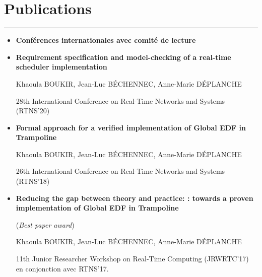 \newpage
\section{Publications} \label{sec:publi}
\vspace{-0.6cm}
\hspace{0.7cm}\textcolor{myblue}{\rule{15cm}{1mm}}


\begin{itemize}
	\item \textbf{{\Large Conférences internationales avec comité de lecture }}	
\end{itemize}

\begin{minipage}{0.08\textwidth}
	\hspace{0.1cm}
\end{minipage}
\begin{minipage}{0.9\textwidth}
	
	\begin{itemize}[label=\cite{boukir2020requirement}]
		\item	\textbf{Requirement specification and model-checking of a real-time scheduler implementation}
		
		Khaoula BOUKIR, Jean-Luc B\'{E}CHENNEC, Anne-Marie D\'{E}PLANCHE
		
		28th International Conference on Real-Time Networks and Systems (RTNS'20)
		
		
		
	\end{itemize}
	
	\begin{itemize}[label=	\cite{boukir2018formal} ]
		\item	\textbf{Formal approach for a verified implementation of Global EDF in Trampoline}
		
		Khaoula BOUKIR, Jean-Luc B\'{E}CHENNEC, Anne-Marie D\'{E}PLANCHE
		
		26th International Conference on Real-Time Networks and Systems (RTNS'18)
	\end{itemize}
	
	\begin{itemize}[label=	\cite{boukir2017reducing}]
		\item	\textbf{Reducing the gap between theory and practice: : towards a proven implementation of Global EDF in Trampoline}
		
		(\textit{Best paper award})
		
		Khaoula BOUKIR, Jean-Luc B\'{E}CHENNEC, Anne-Marie D\'{E}PLANCHE
		
		11th Junior Researcher Workshop on Real-Time Computing (JRWRTC'17) en conjonction avec RTNS'17.
	\end{itemize}
\end{minipage}

